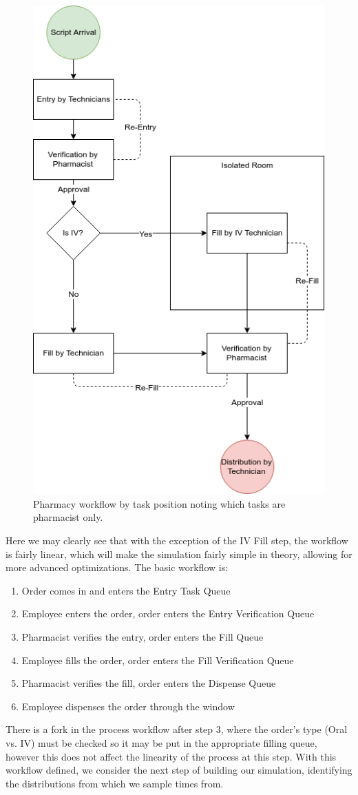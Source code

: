 \documentclass[10pt]{report}            %
\begin{document}
\begin{figure}[H]
\centering
\includegraphics[scale=.5]{Flowchart.png}
\caption{Pharmacy workflow by task position noting which tasks are pharmacist only.}
\label{fig:flowchart}
\end{figure}
Here we may clearly see that with the exception of the IV Fill step, the workflow is fairly linear, which will make the simulation fairly simple in theory, allowing for more advanced optimizations. The basic workflow is:
\begin{enumerate}
\item Order comes in and enters the Entry Task Queue
\item Employee enters the order, order enters the Entry Verification Queue
\item Pharmacist verifies the entry, order enters the Fill Queue
\item Employee fills the order, order enters the Fill Verification Queue
\item Pharmacist verifies the fill, order enters the Dispense Queue
\item Employee dispenses the order through the window
\end{enumerate}
There is a fork in the process workflow after step 3, where the order's type (Oral vs. IV) must be checked so it may be put in the appropriate filling queue, however this does not affect the linearity of the process at this step. With this workflow defined, we consider the next step of building our simulation, identifying the distributions from which we sample times from.
\end{document}
